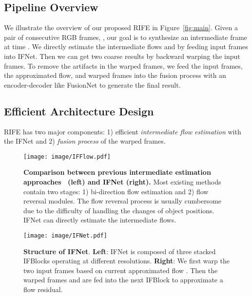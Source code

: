 \documentclass[10pt,twocolumn,letterpaper]{article}
\begin{document}
\subsection{Pipeline Overview}
\label{subsec:overview}



We illustrate the overview of our proposed RIFE in Figure~\ref{fig:main}. Given a pair of consecutive RGB frames, , our goal is to synthesize an intermediate frame  at time . We directly estimate the intermediate flows  and  by feeding input frames into IFNet. Then we can get two coarse results  by backward warping the input frames. To remove the artifacts in the warped frames, we feed the input frames, the approximated flow, and warped frames into the fusion process with an encoder-decoder like FusionNet to generate the final result. 

\subsection{Efficient Architecture Design}
\label{subsec:architecture}

RIFE has two major components: 1) efficient \textit{intermediate flow estimation} with the IFNet and 2) \textit{fusion process} of the warped frames.


\begin{figure}[t]
	\centering
	\texttt{[image: image/IFFlow.pdf]}
	\caption{\textbf{Comparison between previous intermediate estimation approaches~\cite{jiang2018super, xu2019quadratic, bao2019depth, liu2020enhanced} (left) and IFNet (right).} Most existing methods contain two stages: 1) bi-direction flow estimation and 2) flow reversal modules. The flow reversal process is usually cumbersome due to the difficulty of handling the changes of object positions. IFNet can directly estimate the intermediate flows. }\label{fig:IFFlow}
	\vspace{-1em}
\end{figure}

\begin{figure}[t]
	\centering
	\texttt{[image: image/IFNet.pdf]}
	\caption{\textbf{Structure of IFNet}. \textbf{Left}: IFNet is composed of three stacked IFBlocks operating at different resolutions. \textbf{Right}: We first warp the two input frames based on current approximated flow . Then the warped frames  and  are fed into the next IFBlock to approximate a flow residual. }\label{fig:IFNet}
\end{figure}
\end{document}

